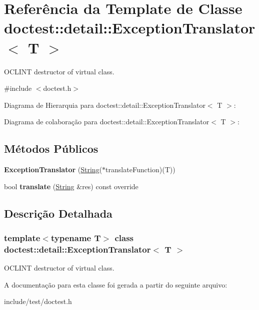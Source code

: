 \hypertarget{classdoctest_1_1detail_1_1ExceptionTranslator}{}\section{Referência da Template de Classe doctest\+:\+:detail\+:\+:Exception\+Translator$<$ T $>$}
\label{classdoctest_1_1detail_1_1ExceptionTranslator}


O\+C\+L\+I\+NT destructor of virtual class.  




{\ttfamily \#include $<$doctest.\+h$>$}



Diagrama de Hierarquia para doctest\+:\+:detail\+:\+:Exception\+Translator$<$ T $>$\+:


Diagrama de colaboração para doctest\+:\+:detail\+:\+:Exception\+Translator$<$ T $>$\+:
\subsection*{Métodos Públicos}
\begin{DoxyCompactItemize}
\item 
\mbox{\label{classdoctest_1_1detail_1_1ExceptionTranslator_a3ac05488993c40c6ba55ce51a6bf7eae}} 
{\bfseries Exception\+Translator} (\hyperlink{classdoctest_1_1String}{String}($\ast$translate\+Function)(T))
\item 
\mbox{\label{classdoctest_1_1detail_1_1ExceptionTranslator_a56484c4218a06bbbd1548335a8b64110}} 
bool {\bfseries translate} (\hyperlink{classdoctest_1_1String}{String} \&res) const override
\end{DoxyCompactItemize}


\subsection{Descrição Detalhada}
\subsubsection*{template$<$typename T$>$\newline
class doctest\+::detail\+::\+Exception\+Translator$<$ T $>$}

O\+C\+L\+I\+NT destructor of virtual class. 

A documentação para esta classe foi gerada a partir do seguinte arquivo\+:\begin{DoxyCompactItemize}
\item 
include/test/doctest.\+h\end{DoxyCompactItemize}
